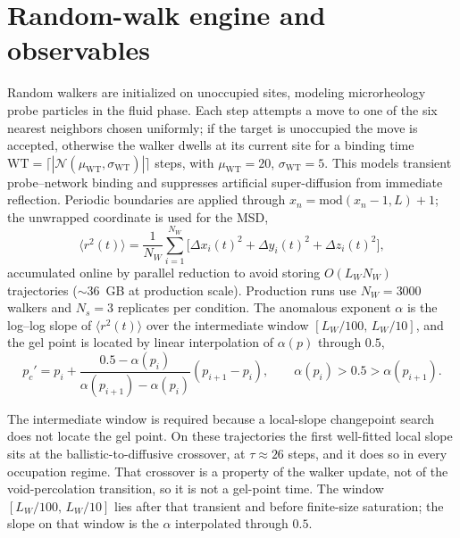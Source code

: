 \documentclass[aps,prl,onecolumn,superscriptaddress,nofootinbib,longbibliography]{revtex4-2}
\newcommand{\msd}{\langle r^2(t)\rangle}
\newcommand{\pcp}{p_c'}
\begin{document}
\section{Random-walk engine and observables}
Random walkers are initialized on unoccupied sites, modeling microrheology probe particles in
the fluid phase. Each step attempts a move to one of the six nearest neighbors chosen uniformly;
if the target is unoccupied the move is accepted, otherwise the walker dwells at its current site
for a binding time $\mathrm{WT}=\lceil|\mathcal{N}(\mu_{\mathrm{WT}},\sigma_{\mathrm{WT}})|\rceil$
steps, with $\mu_{\mathrm{WT}}=20$, $\sigma_{\mathrm{WT}}=5$. This models transient probe--network
binding and suppresses artificial super-diffusion from immediate reflection. Periodic boundaries
are applied through $x_n=\mathrm{mod}(x_n-1,L)+1$; the unwrapped coordinate is used for the MSD,
\begin{equation}
  \msd=\frac{1}{N_W}\sum_{i=1}^{N_W}\big[\Delta x_i(t)^2+\Delta y_i(t)^2+\Delta z_i(t)^2\big],
\end{equation}
accumulated online by parallel reduction to avoid storing $O(L_W N_W)$ trajectories
($\sim$36~GB at production scale). Production runs use $N_W=3000$ walkers and $N_s=3$ replicates
per condition. The anomalous exponent $\alpha$ is the log--log slope of $\msd$ over the
intermediate window $[L_W/100,\,L_W/10]$, and the gel point is located by linear interpolation of
$\alpha(p)$ through $0.5$,
\begin{equation}
  \pcp=p_i+\frac{0.5-\alpha(p_i)}{\alpha(p_{i+1})-\alpha(p_i)}(p_{i+1}-p_i),
  \qquad \alpha(p_i)>0.5>\alpha(p_{i+1}).
\end{equation}

The intermediate window is required because a local-slope changepoint search does not locate the gel point. On these trajectories the first well-fitted local slope sits at the ballistic-to-diffusive crossover, at $\tau \approx 26$ steps, and it does so in every occupation regime. That crossover is a property of the walker update, not of the void-percolation transition, so it is not a gel-point time. The window $[L_W/100,\,L_W/10]$ lies after that transient and before finite-size saturation; the slope on that window is the $\alpha$ interpolated through $0.5$.

\end{document}
